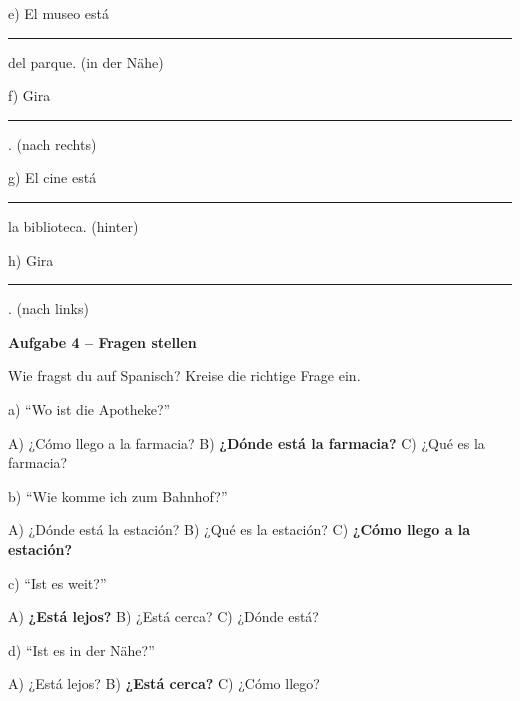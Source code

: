 \documentclass[11pt, a4paper]{article}
\newcommand{\fachfarbe}{spanisch}
\newcommand{\punktebox}[1]{\hfill\fbox{\small \_\_\_/#1}}
\newcommand{\luecke}[1]{\rule{#1}{0.4pt}}
\newenvironment{aufgabe}[1]{%
    \needspace{5\baselineskip}%
    \nopagebreak[4]%
    \vspace{10pt}
    \noindent\textbf{\textcolor{\fachfarbe}{Aufgabe #1}}
    \nopagebreak[4]%
    \vspace{5pt}
    \nopagebreak[4]%
    \begin{list}{}{\leftmargin=0pt}
    \item[]
}{%
    \end{list}
}
\begin{document}
\noindent
e) El museo está \luecke{4cm} del parque. (in der Nähe)

\vspace{0.8em}

\noindent
f) Gira \luecke{4cm}. (nach rechts)

\vspace{0.8em}

\noindent
g) El cine está \luecke{4cm} la biblioteca. (hinter)

\vspace{0.8em}

\noindent
h) Gira \luecke{4cm}. (nach links)

\vspace{15pt}


\begin{aufgabe}{4 -- Fragen stellen}
Wie fragst du auf Spanisch? Kreise die richtige Frage ein. \punktebox{6}
\end{aufgabe}

\noindent
a) ``Wo ist die Apotheke?''

\hspace{1cm} A) ¿Cómo llego a la farmacia? \quad B) \textbf{¿Dónde está la farmacia?} \quad C) ¿Qué es la farmacia?

\vspace{0.8em}

\noindent
b) ``Wie komme ich zum Bahnhof?''

\hspace{1cm} A) ¿Dónde está la estación? \quad B) ¿Qué es la estación? \quad C) \textbf{¿Cómo llego a la estación?}

\vspace{0.8em}

\noindent
c) ``Ist es weit?''

\hspace{1cm} A) \textbf{¿Está lejos?} \quad B) ¿Está cerca? \quad C) ¿Dónde está?

\vspace{0.8em}

\noindent
d) ``Ist es in der Nähe?''

\hspace{1cm} A) ¿Está lejos? \quad B) \textbf{¿Está cerca?} \quad C) ¿Cómo llego?

\vspace{0.8em}
\end{document}
